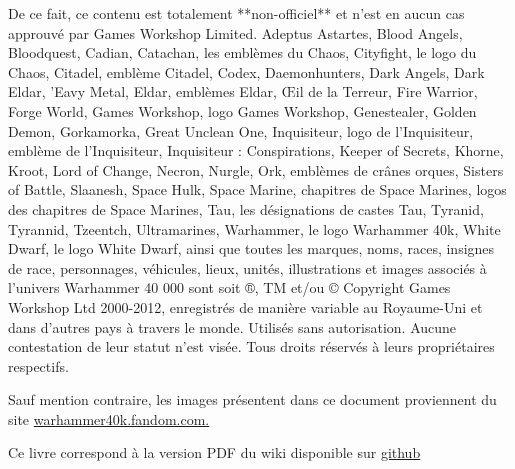 De ce fait, ce contenu est totalement **non-officiel** et n'est en aucun cas approuvé par Games Workshop Limited. Adeptus Astartes, Blood Angels, Bloodquest, Cadian, Catachan, les emblèmes du Chaos, Cityfight, le logo du Chaos, Citadel, emblème Citadel, Codex, Daemonhunters, Dark Angels, Dark Eldar, 'Eavy Metal, Eldar, emblèmes Eldar, Œil de la Terreur, Fire Warrior, Forge World, Games Workshop, logo Games Workshop, Genestealer, Golden Demon, Gorkamorka, Great Unclean One, Inquisiteur, logo de l'Inquisiteur, emblème de l'Inquisiteur, Inquisiteur : Conspirations, Keeper of Secrets, Khorne, Kroot, Lord of Change, Necron, Nurgle, Ork, emblèmes de crânes orques, Sisters of Battle, Slaanesh, Space Hulk, Space Marine, chapitres de Space Marines, logos des chapitres de Space Marines, Tau, les désignations de castes Tau, Tyranid, Tyrannid, Tzeentch, Ultramarines, Warhammer, le logo Warhammer 40k, White Dwarf, le logo White Dwarf, ainsi que toutes les marques, noms, races, insignes de race, personnages, véhicules, lieux, unités, illustrations et images associés à l'univers Warhammer 40 000 sont soit ®, TM et/ou © Copyright Games Workshop Ltd 2000-2012, enregistrés de manière variable au Royaume-Uni et dans d'autres pays à travers le monde. Utilisés sans autorisation. Aucune contestation de leur statut n'est visée. Tous droits réservés à leurs propriétaires respectifs.

Sauf mention contraire, les images présentent dans ce document proviennent du site \href{https://warhammer40k.fandom.com}{warhammer40k.fandom.com.}

Ce livre correspond à la version PDF du wiki disponible sur \href{https://drdam.github.io/dnd2w40k/}{github}

\clearpage
